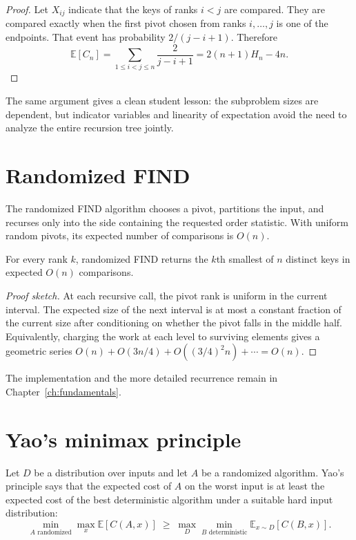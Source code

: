 \begin{proof}
Let $X_{ij}$ indicate that the keys of ranks $i<j$ are compared.  They are
compared exactly when the first pivot chosen from ranks $i,\ldots,j$ is one
of the endpoints.  That event has probability $2/(j-i+1)$.  Therefore
\[
 \mathbb{E}[C_n]=\sum_{1\leq i<j\leq n}\frac{2}{j-i+1}
 =2(n+1)H_n-4n.
\]
\end{proof}

The same argument gives a clean student lesson: the subproblem sizes are
dependent, but indicator variables and linearity of expectation avoid the
need to analyze the entire recursion tree jointly.

\section{Randomized FIND}

The randomized FIND algorithm chooses a pivot, partitions the input, and
recurses only into the side containing the requested order statistic.  With
uniform random pivots, its expected number of comparisons is $O(n)$.

\begin{theorem}
For every rank $k$, randomized FIND returns the $k$th smallest of $n$
distinct keys in expected $O(n)$ comparisons.
\end{theorem}

\begin{proof}[Proof sketch]
At each recursive call, the pivot rank is uniform in the current interval.
The expected size of the next interval is at most a constant fraction of the
current size after conditioning on whether the pivot falls in the middle
half.  Equivalently, charging the work at each level to surviving elements
gives a geometric series $O(n)+O(3n/4)+O((3/4)^2n)+\cdots=O(n)$.
\end{proof}

The implementation and the more detailed recurrence remain in
Chapter~\ref{ch:fundamentals}.

\section{Yao's minimax principle}

Let $D$ be a distribution over inputs and let $A$ be a randomized algorithm.
Yao's principle says that the expected cost of $A$ on the worst input is at
least the expected cost of the best deterministic algorithm under a suitable
hard input distribution:
\[
 \min_{A\text{ randomized}}\max_x\mathbb{E}[C(A,x)]
 \;\geq\;
 \max_D\min_{B\text{ deterministic}}\mathbb{E}_{x\sim D}[C(B,x)].
\]

